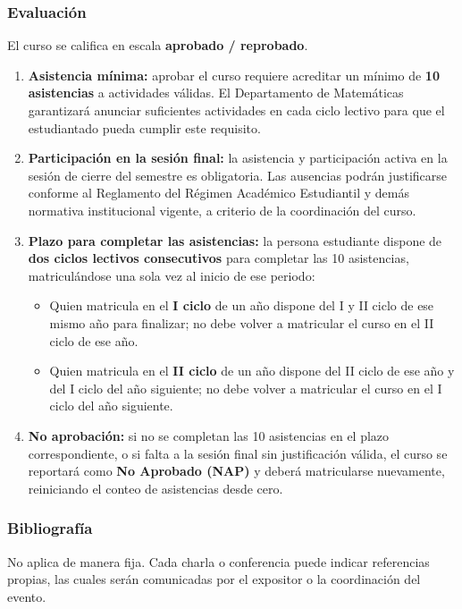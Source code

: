 \begin{refsection}
%

\subsubsection*{Evaluación}

El curso se califica en escala \textbf{aprobado / reprobado}.

\begin{enumerate}
\item \textbf{Asistencia mínima:} aprobar el curso requiere acreditar un mínimo de \textbf{10 asistencias} a actividades válidas. El Departamento de Matemáticas garantizará anunciar suficientes actividades en cada ciclo lectivo para que el estudiantado pueda cumplir este requisito.
\item \textbf{Participación en la sesión final:} la asistencia y participación activa en la sesión de cierre del semestre es obligatoria. Las ausencias podrán justificarse conforme al Reglamento del Régimen Académico Estudiantil y demás normativa institucional vigente, a criterio de la coordinación del curso.
\item \textbf{Plazo para completar las asistencias:} la persona estudiante dispone de \textbf{dos ciclos lectivos consecutivos} para completar las 10 asistencias, matriculándose una sola vez al inicio de ese periodo:
\begin{itemize}
\item Quien matricula en el \textbf{I ciclo} de un año dispone del I y II ciclo de ese mismo año para finalizar; no debe volver a matricular el curso en el II ciclo de ese año.
\item Quien matricula en el \textbf{II ciclo} de un año dispone del II ciclo de ese año y del I ciclo del año siguiente; no debe volver a matricular el curso en el I ciclo del año siguiente.
\end{itemize}
\item \textbf{No aprobación:} si no se completan las 10 asistencias en el plazo correspondiente, o si falta a la sesión final sin justificación válida, el curso se reportará como \textbf{No Aprobado (NAP)} y deberá matricularse nuevamente, reiniciando el conteo de asistencias desde cero.
\end{enumerate}

\subsubsection*{Bibliografía}

No aplica de manera fija. Cada charla o conferencia puede indicar referencias propias, las cuales serán comunicadas por el expositor o la coordinación del evento.

\end{refsection}
